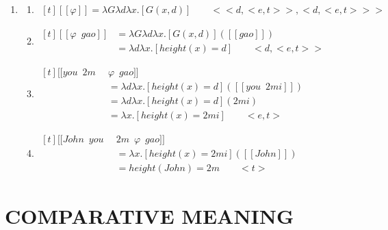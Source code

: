 \documentclass{ctexart}
\begin{document}
\begin{enumerate}
    \item \label{assignable_example_lambda}
    \begin{enumerate}
        \item \label{assignable_example_lambda_a}
        $\begin{aligned}[t]
            [\![\varphi]\!] = \lambda G \lambda d \lambda x.[G(x,d)] \qquad <<d,<e,t>>,<d,<e,t>>>
        \end{aligned}$

        \item \label{assignable_example_lambda_b}
        $\begin{aligned}[t]
            [\![\varphi \enspace gao]\!] 
            &= \lambda G \lambda d \lambda x.[G(x,d)]([\![gao]\!]) \\
            &= \lambda d \lambda x.[height(x) = d] \qquad <d,<e,t>>
        \end{aligned}$

        \item \label{assignable_example_lambda_c}
        $\begin{aligned}[t]
            [\![you \enspace 2m \enspace &\varphi \enspace gao]\!] \\
            &= \lambda d \lambda x.[height(x) = d]([\![you \enspace 2mi]\!]) \\
            &= \lambda d \lambda x.[height(x) = d](2mi) \\
            &= \lambda x.[height(x) = 2mi] \qquad <e,t>
        \end{aligned}$

        \item \label{assignable_example_lambda_d}
        $\begin{aligned}[t]
            [\![John \enspace you \enspace &2m \enspace \varphi \enspace gao]\!] \\
            &= \lambda x.[height(x) = 2mi]([\![John]\!]) \\
            &= height(John)=2m \qquad <t>
        \end{aligned}$
        
    \end{enumerate}
\end{enumerate}

\section{COMPARATIVE MEANING}
\end{document}
